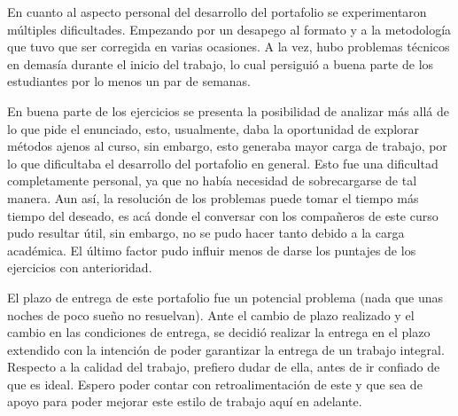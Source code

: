 \documentclass[../portafolio.tex]{subfiles}
\begin{document}

En cuanto al aspecto personal del desarrollo del portafolio se experimentaron múltiples dificultades. Empezando por un desapego al formato y a la metodología que tuvo que ser corregida en varias ocasiones. A la vez, hubo problemas técnicos en demasía durante el inicio del trabajo, lo cual persiguió a buena parte de los estudiantes por lo menos un par de semanas.


En buena parte de los ejercicios se presenta la posibilidad de analizar más allá de lo que pide el enunciado, esto, usualmente, daba la oportunidad de explorar métodos ajenos al curso, sin embargo, esto generaba mayor carga de trabajo, por lo que dificultaba el desarrollo del portafolio en general. Esto fue una dificultad completamente personal, ya que no había necesidad de sobrecargarse de tal manera.
Aun así, la resolución de los problemas puede tomar el tiempo más tiempo del deseado, es acá donde el conversar con los compañeros de este curso pudo resultar útil, sin embargo, no se pudo hacer tanto debido a la carga académica. El último factor pudo influir menos de darse los puntajes de los ejercicios con anterioridad.


El plazo de entrega de este portafolio fue un potencial problema (nada que unas noches de poco sueño no resuelvan). Ante el cambio de plazo realizado y el cambio en las condiciones de entrega, se decidió realizar la entrega en el plazo extendido con la intención de poder garantizar la entrega de un trabajo integral.
Respecto a la calidad del trabajo, prefiero dudar de ella, antes de ir confiado de que es ideal. Espero poder contar con retroalimentación de este y que sea de apoyo para poder mejorar este estilo de trabajo aquí en adelante.

\end{document}
